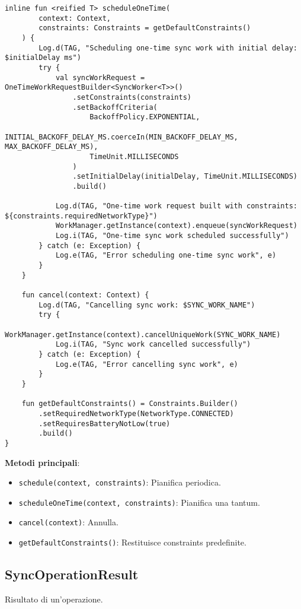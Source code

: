 \begin{lstlisting}[caption=SyncOperationScheduler.kt, label=lst:syncoperationscheduler, basicstyle=\ttfamily\scriptsize, breaklines=true, breakatwhitespace=true, tabsize=4]
    inline fun <reified T> scheduleOneTime(
        context: Context,
        constraints: Constraints = getDefaultConstraints()
    ) {
        Log.d(TAG, "Scheduling one-time sync work with initial delay: $initialDelay ms")
        try {
            val syncWorkRequest = OneTimeWorkRequestBuilder<SyncWorker<T>>()
                .setConstraints(constraints)
                .setBackoffCriteria(
                    BackoffPolicy.EXPONENTIAL,
                    INITIAL_BACKOFF_DELAY_MS.coerceIn(MIN_BACKOFF_DELAY_MS, MAX_BACKOFF_DELAY_MS),
                    TimeUnit.MILLISECONDS
                )
                .setInitialDelay(initialDelay, TimeUnit.MILLISECONDS)
                .build()

            Log.d(TAG, "One-time work request built with constraints: ${constraints.requiredNetworkType}")
            WorkManager.getInstance(context).enqueue(syncWorkRequest)
            Log.i(TAG, "One-time sync work scheduled successfully")
        } catch (e: Exception) {
            Log.e(TAG, "Error scheduling one-time sync work", e)
        }
    }

    fun cancel(context: Context) {
        Log.d(TAG, "Cancelling sync work: $SYNC_WORK_NAME")
        try {
            WorkManager.getInstance(context).cancelUniqueWork(SYNC_WORK_NAME)
            Log.i(TAG, "Sync work cancelled successfully")
        } catch (e: Exception) {
            Log.e(TAG, "Error cancelling sync work", e)
        }
    }

    fun getDefaultConstraints() = Constraints.Builder()
        .setRequiredNetworkType(NetworkType.CONNECTED)
        .setRequiresBatteryNotLow(true)
        .build()
}
\end{lstlisting}

\textbf{Metodi principali}:
\begin{itemize}
    \item \texttt{schedule(context, constraints)}: Pianifica periodica.
    \item \texttt{scheduleOneTime(context, constraints)}: Pianifica una tantum.
    \item \texttt{cancel(context)}: Annulla.
    \item \texttt{getDefaultConstraints()}: Restituisce constraints predefinite.
\end{itemize}

\subsection{SyncOperationResult}\label{subsec:syncoperationresult} Risultato di un'operazione.

